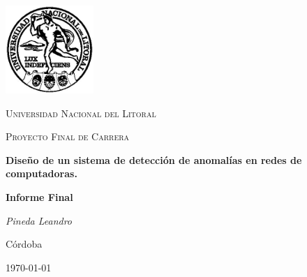 \documentclass[a4paper,10pt, oneside]{article}
\begin{document}
	
\begin{titlepage}
	\centering
	\includegraphics[width=0.25\textwidth]{../Universidad_del_Litoral}\par\vspace{1cm}
	{\scshape\LARGE Universidad Nacional del Litoral \par}
	\vspace{1cm}
	{\scshape\Large Proyecto Final de Carrera\par}
	\vspace{1.5cm}
	{\huge\bfseries Diseño de un sistema de detección de anomalías en redes de computadoras.\par}
	\vspace{4cm}
	{\huge\bfseries Informe Final\par}
	\vfill
	
	{\Large \itshape Pineda Leandro\par}
	
	
	\large Córdoba\par
	{\large \today\par}	
\end{titlepage}

\modulolinenumbers[5]
\linenumbers


\clearpage\mbox{}\clearpage
\tableofcontents

\newpage
\end{document}
